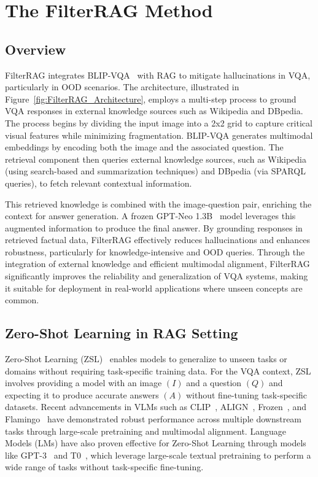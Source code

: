 \section{The FilterRAG Method}
\label{sec:FilterRAG_Method}

\subsection{Overview}
FilterRAG integrates BLIP-VQA~\cite{li2022blip} with RAG to mitigate hallucinations in VQA, particularly in OOD scenarios. The architecture, illustrated in Figure~\ref{fig:FilterRAG_Architecture}, employs a multi-step process to ground VQA responses in external knowledge sources such as Wikipedia and DBpedia. The process begins by dividing the input image into a 2x2 grid to capture critical visual features while minimizing fragmentation. BLIP-VQA generates multimodal embeddings by encoding both the image and the associated question. The retrieval component then queries external knowledge sources, such as Wikipedia (using search-based and summarization techniques) and DBpedia (via SPARQL queries), to fetch relevant contextual information.

This retrieved knowledge is combined with the image-question pair, enriching the context for answer generation. A frozen GPT-Neo 1.3B~\cite{gpt-neo} model leverages this augmented information to produce the final answer. By grounding responses in retrieved factual data, FilterRAG effectively reduces hallucinations and enhances robustness, particularly for knowledge-intensive and OOD queries. Through the integration of external knowledge and efficient multimodal alignment, FilterRAG significantly improves the reliability and generalization of VQA systems, making it suitable for deployment in real-world applications where unseen concepts are common.

\subsection{Zero-Shot Learning in RAG Setting}
Zero-Shot Learning (ZSL)~\cite{xian2018zero, wang2019survey} enables models to generalize to unseen tasks or domains without requiring task-specific training data. For the VQA context, ZSL involves providing a model with an image $(I)$ and a question $(Q)$ and expecting it to produce accurate answers $(A)$ without fine-tuning task-specific datasets. Recent advancements in VLMs such as CLIP~\cite{radford2021learning}, ALIGN~\cite{jia2021scaling}, Frozen~\cite{tsimpoukelli2021multimodal}, and Flamingo~\cite{alayrac2022flamingo} have demonstrated robust performance across multiple downstream tasks through large-scale pretraining and multimodal alignment. Language Models (LMs) have also proven effective for Zero-Shot Learning through models like GPT-3~\cite{brown2020language} and T0~\cite{sanh2021multitask}, which leverage large-scale textual pretraining to perform a wide range of tasks without task-specific fine-tuning. 

